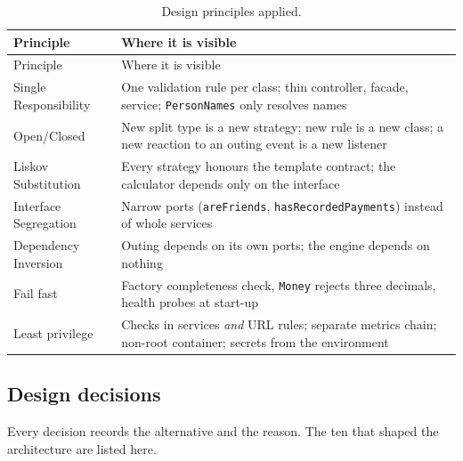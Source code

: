 \documentclass[10pt,a4paper]{article}
\newcommand{\code}[1]{\texttt{#1}}
\begin{document}
{\small
\begin{longtable}{@{}>{\raggedright\arraybackslash}p{3.6cm}>{\raggedright\arraybackslash}p{12.2cm}@{}}
\caption{Design principles applied.}\\
\toprule
Principle & Where it is visible \\
\midrule
\endfirsthead
\toprule
Principle & Where it is visible \\
\midrule
\endhead
\bottomrule
\endfoot
Single Responsibility & One validation rule per class; thin controller, facade, service; \code{PersonNames} only resolves names \\
Open/Closed & New split type is a new strategy; new rule is a new class; a new reaction to an outing event is a new listener \\
Liskov Substitution & Every strategy honours the template contract; the calculator depends only on the interface \\
Interface Segregation & Narrow ports (\code{areFriends}, \code{hasRecordedPayments}) instead of whole services \\
Dependency Inversion & Outing depends on its own ports; the engine depends on nothing \\
Fail fast & Factory completeness check, \code{Money} rejects three decimals, health probes at start-up \\
Least privilege & Checks in services \emph{and} URL rules; separate metrics chain; non-root container; secrets from the environment \\
\end{longtable}}

\subsection{Design decisions}

Every decision records the alternative and the reason. The ten that shaped the architecture are listed here.
\end{document}
